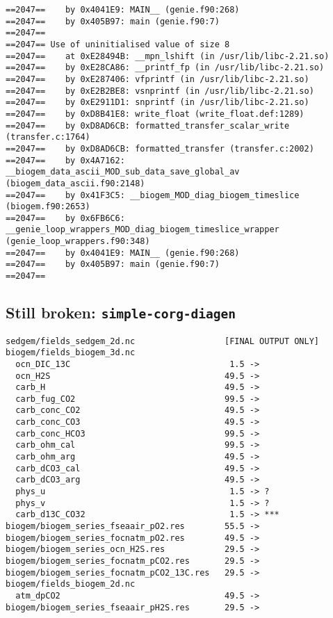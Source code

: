 \documentclass[a4paper,10pt,article]{memoir}
\begin{document}
\begin{verbatim}
==2047==    by 0x4041E9: MAIN__ (genie.f90:268)
==2047==    by 0x405B97: main (genie.f90:7)
==2047==
==2047== Use of uninitialised value of size 8
==2047==    at 0xE28494B: __mpn_lshift (in /usr/lib/libc-2.21.so)
==2047==    by 0xE28CA86: __printf_fp (in /usr/lib/libc-2.21.so)
==2047==    by 0xE287406: vfprintf (in /usr/lib/libc-2.21.so)
==2047==    by 0xE2B2BE8: vsnprintf (in /usr/lib/libc-2.21.so)
==2047==    by 0xE2911D1: snprintf (in /usr/lib/libc-2.21.so)
==2047==    by 0xD8B41E8: write_float (write_float.def:1289)
==2047==    by 0xD8AD6CB: formatted_transfer_scalar_write (transfer.c:1764)
==2047==    by 0xD8AD6CB: formatted_transfer (transfer.c:2002)
==2047==    by 0x4A7162: __biogem_data_ascii_MOD_sub_data_save_global_av (biogem_data_ascii.f90:2148)
==2047==    by 0x41F3C5: __biogem_MOD_diag_biogem_timeslice (biogem.f90:2653)
==2047==    by 0x6FB6C6: __genie_loop_wrappers_MOD_diag_biogem_timeslice_wrapper (genie_loop_wrappers.f90:348)
==2047==    by 0x4041E9: MAIN__ (genie.f90:268)
==2047==    by 0x405B97: main (genie.f90:7)
==2047==
\end{verbatim}


\subsection{Still broken: \texttt{simple-corg-diagen}}

\begin{verbatim}
sedgem/fields_sedgem_2d.nc                  [FINAL OUTPUT ONLY]
biogem/fields_biogem_3d.nc
  ocn_DIC_13C                                1.5 ->
  ocn_H2S                                   49.5 ->
  carb_H                                    49.5 ->
  carb_fug_CO2                              99.5 ->
  carb_conc_CO2                             49.5 ->
  carb_conc_CO3                             49.5 ->
  carb_conc_HCO3                            99.5 ->
  carb_ohm_cal                              99.5 ->
  carb_ohm_arg                              49.5 ->
  carb_dCO3_cal                             49.5 ->
  carb_dCO3_arg                             49.5 ->
  phys_u                                     1.5 -> ?
  phys_v                                     1.5 -> ?
  carb_d13C_CO32                             1.5 -> ***
biogem/biogem_series_fseaair_pO2.res        55.5 ->
biogem/biogem_series_focnatm_pO2.res        49.5 ->
biogem/biogem_series_ocn_H2S.res            29.5 ->
biogem/biogem_series_focnatm_pCO2.res       29.5 ->
biogem/biogem_series_focnatm_pCO2_13C.res   29.5 ->
biogem/fields_biogem_2d.nc
  atm_dpCO2                                 49.5 ->
biogem/biogem_series_fseaair_pH2S.res       29.5 ->
\end{verbatim}
\end{document}
